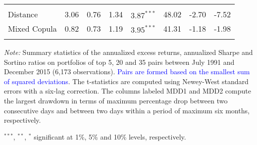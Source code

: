 \documentclass[pdf,9pt,xcolor=dvipsnames,hide notes]{beamer}
\begin{document}
\begin{frame}
\begin{threeparttable}[H]
\begin{tabularx}{\textwidth}{@{\extracolsep{\fill}}llllllll@{}}
				&       &       &       &       &       &       &  \\
				Distance & \cellcolor{celadon} 3.06  & \cellcolor{celadon} 0.76  & 1.34  & $3.87^{***}$  & 48.02 & -2.70  & -7.52 \\
				Mixed Copula & 0.82  & 0.73  & 1.19  & $3.95^{***}$  & 41.31 & \cellcolor{corn} -1.18  & \cellcolor{corn} -1.98  \\
				\multicolumn{1}{r}{} & \multicolumn{1}{r}{} & \multicolumn{1}{r}{} & \multicolumn{1}{r}{} & \multicolumn{1}{r}{} & \multicolumn{1}{r}{} & \multicolumn{1}{r}{} & \multicolumn{1}{r}{} \\
				\bottomrule
			\end{tabularx}%
			\begin{tablenotes}
				\item \textit{Note:} \scriptsize \tiny Summary statistics of the annualized excess returns, annualized Sharpe and Sortino ratios on portfolios of top 5, 20 and 35 pairs between July 1991 and December 2015 (6,173 observations). \textcolor{blue} {Pairs are formed based on the smallest sum of squared deviations}. The t-statistics are computed using Newey-West standard errors with a six-lag correction. The columns labeled MDD1 and MDD2 compute the largest drawdown in terms of maximum percentage drop between two consecutive days and between two days within a period of maximum six months, respectively.
				\item \scriptsize $^{\ast\ast\ast}$, $^{\ast\ast}$, $^{\ast}$  significant at 1\%, 5\% and 10\% levels, respectively.
			\end{tablenotes}
			\label{tab:table101}%
		\end{threeparttable}%

	
\end{frame}
\end{document}
